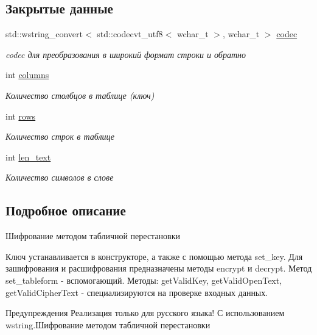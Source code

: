 \subsection*{Закрытые данные}
\begin{DoxyCompactItemize}
\item 
\mbox{\label{classCipher_a771e84ee997948183d065a2804f3cda6}} 
std\+::wstring\+\_\+convert$<$ std\+::codecvt\+\_\+utf8$<$ wchar\+\_\+t $>$, wchar\+\_\+t $>$ \hyperlink{classCipher_a771e84ee997948183d065a2804f3cda6}{codec}
\begin{DoxyCompactList}\small\item\em codec для преобразования в широкий формат строки и обратно \end{DoxyCompactList}\item 
\mbox{\label{classCipher_a4fa1fd596bd312cbf0f7628ac72a60d5}} 
int \hyperlink{classCipher_a4fa1fd596bd312cbf0f7628ac72a60d5}{columns}
\begin{DoxyCompactList}\small\item\em Количество столбцов в таблице (ключ) \end{DoxyCompactList}\item 
\mbox{\label{classCipher_ace25b12087068c25c945e2a32a236f9e}} 
int \hyperlink{classCipher_ace25b12087068c25c945e2a32a236f9e}{rows}
\begin{DoxyCompactList}\small\item\em Количество строк в таблице \end{DoxyCompactList}\item 
\mbox{\label{classCipher_a84f8e0da2b41787fa92554549963f052}} 
int \hyperlink{classCipher_a84f8e0da2b41787fa92554549963f052}{len\+\_\+text}
\begin{DoxyCompactList}\small\item\em Количество символов в слове \end{DoxyCompactList}\end{DoxyCompactItemize}


\subsection{Подробное описание}
Шифрование методом табличной перестановки 

Ключ устанавливается в конструкторе, а также с помощью метода set\+\_\+key. Для зашифрования и расшифрования предназначены методы encrypt и decrypt. Метод set\+\_\+tableform -\/ вспомогающий. Методы\+: get\+Valid\+Key, get\+Valid\+Open\+Text, get\+Valid\+Cipher\+Text -\/ специализируются на проверке входных данных. \begin{DoxyWarning}{Предупреждения}
Реализация только для русского языка! С использованием wstring.\+Шифрование методом табличной перестановки 
\end{DoxyWarning}


